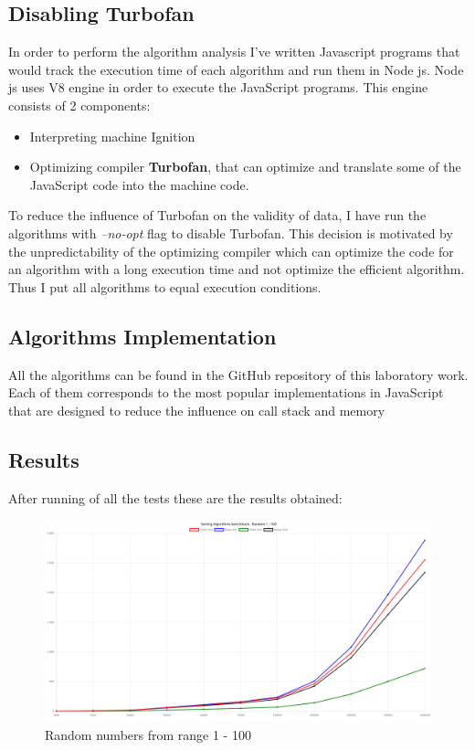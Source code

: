 \documentclass[12pt]{article}
\begin{document}
\subsection*{Disabling Turbofan}
In order to perform the algorithm analysis I've written Javascript programs that would track the execution time of each algorithm
and run them in Node js. Node js uses V8 engine in order to execute the JavaScript programs. This engine consists of 2 components:
\begin{itemize}
  \item Interpreting machine Ignition\cite{bytecoderef}
  \item Optimizing compiler \textbf{Turbofan}, that can optimize and translate some of the JavaScript code into the machine code.

\end{itemize}
To reduce the influence of Turbofan on the validity of data, 
I have run the algorithms with \textit{--no-opt} flag to disable Turbofan.
This decision is motivated by the unpredictability of the optimizing compiler which can 
optimize the code for an algorithm with a long execution time and not optimize the efficient algorithm.
Thus I put all algorithms to equal execution conditions.

\subsection*{Algorithms Implementation}
All the algorithms can be found in the GitHub\cite{github} repository of this laboratory
work. Each of them corresponds to the most popular implementations in JavaScript
that are designed to reduce the influence on call stack and memory

\subsection*{Results}
After running of all the tests these are the results obtained:
\begin{figure}[h]
    \centering
    \includegraphics[width=1\textwidth]{random100.png}
    \caption{Random numbers from range 1 - 100}
    \label{fig:rand100}
\end{figure}
\end{document}
